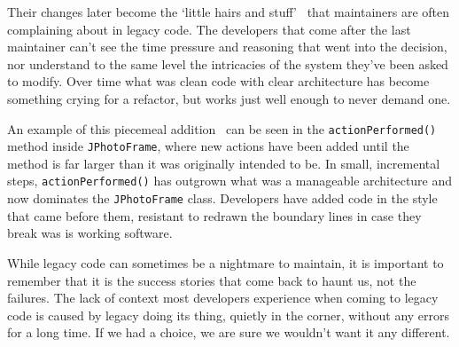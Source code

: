 \documentclass[11pt]{article}
\begin{document}
Their changes later become the `little hairs and
stuff'~\cite{thingsYouShouldNeverDo} that maintainers are often complaining
about in legacy code. The developers that come after the last maintainer can't
see the time pressure and reasoning that went into the decision, nor understand
to the same level the intricacies of the system they've been asked to modify.
Over time what was clean code with clear architecture has become something
crying for a refactor, but works just well enough to never demand one.

An example of this piecemeal addition~\cite{bigBallOfMud} can be seen in the
\texttt{actionPerformed()} method inside \texttt{JPhotoFrame}, where new actions
have been added until the method is far larger than it was originally intended
to be. In small, incremental steps, \texttt{actionPerformed()} has outgrown what
was a manageable architecture and now dominates the \texttt{JPhotoFrame} class.
Developers have added code in the style that came before them, resistant to
redrawn the boundary lines in case they break was is working software.

While legacy code can sometimes be a nightmare to maintain, it is important to
remember that it is the success stories that come back to haunt us, not the
failures. The lack of context most developers experience when coming to legacy
code is caused by legacy doing its thing, quietly in the corner, without any
errors for a long time. If we had a choice, we are sure we wouldn't want it any
different.


\medskip


\newpage
\end{document}
